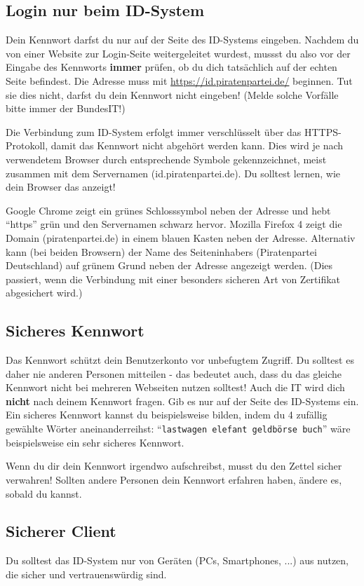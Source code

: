 \documentclass[parskip=half]{scrartcl}
\begin{document}
\subsection{Login nur beim ID-System}
Dein Kennwort darfst du nur auf der Seite des ID-Systems eingeben.
Nachdem du von einer Website zur Login-Seite weitergeleitet wurdest, mussst du also vor der Eingabe des Kennworts \textbf{immer} prüfen,
ob du dich tatsächlich auf der echten Seite befindest.
Die Adresse muss mit \url{https://id.piratenpartei.de/} beginnen. Tut sie dies nicht, darfst du dein Kennwort nicht eingeben!
(Melde solche Vorfälle bitte immer der BundesIT!)

Die Verbindung zum ID-System erfolgt immer verschlüsselt über das HTTPS-Protokoll, damit das Kennwort nicht abgehört werden kann.
Dies wird je nach verwendetem Browser durch entsprechende Symbole gekennzeichnet, meist zusammen mit dem Servernamen (id.piratenpartei.de).
Du solltest lernen, wie dein Browser das anzeigt!

Google Chrome zeigt ein grünes Schlosssymbol neben der Adresse und hebt "`https"' grün und den Servernamen schwarz hervor.
Mozilla Firefox 4 zeigt die Domain (piratenpartei.de) in einem blauen Kasten neben der Adresse.
Alternativ kann (bei beiden Browsern) der Name des Seiteninhabers (Piratenpartei Deutschland) auf grünem Grund neben der Adresse angezeigt werden.
(Dies passiert, wenn die Verbindung mit einer besonders sicheren Art von Zertifikat abgesichert wird.)

\subsection{Sicheres Kennwort}
Das Kennwort schützt dein Benutzerkonto vor unbefugtem Zugriff.
Du solltest es daher nie anderen Personen mitteilen - das bedeutet auch, dass du das gleiche Kennwort nicht bei mehreren Webseiten nutzen solltest!
Auch die IT wird dich \textbf{nicht} nach deinem Kennwort fragen. Gib es nur auf der Seite des ID-Systems ein.
Ein sicheres Kennwort kannst du beispielsweise bilden, indem du 4 zufällig gewählte Wörter aneinanderreihst:
"`\texttt{lastwagen elefant geldbörse buch}"' wäre beispielsweise ein sehr sicheres Kennwort.

Wenn du dir dein Kennwort irgendwo aufschreibst, musst du den Zettel sicher verwahren!
Sollten andere Personen dein Kennwort erfahren haben, ändere es, sobald du kannst.

\subsection{Sicherer Client}
Du solltest das ID-System nur von Geräten (PCs, Smartphones, ...) aus nutzen, die sicher und vertrauenswürdig sind.
\end{document}
